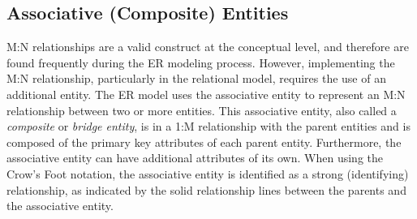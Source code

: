\documentclass[a4paper, 12pt, titlepage]{report}
\begin{document}
{\subsection{Associative (Composite) Entities}
M:N relationships are a valid construct at the conceptual level, and therefore are found frequently during the ER modeling process. However, implementing the M:N
relationship, particularly in the relational model, requires the use of an additional entity. The ER model uses the associative entity to represent an M:N relationship between two or more entities. This associative entity, also called a \emph{composite} or \emph{bridge entity}, is in a 1:M relationship with the parent entities and is composed of
the primary key attributes of each parent entity. Furthermore, the associative entity can have additional attributes of its own. When using the Crow’s Foot notation, the associative entity is identified as a strong (identifying) relationship, as indicated by the solid relationship lines between the parents and the associative entity.

}
\end{document}
